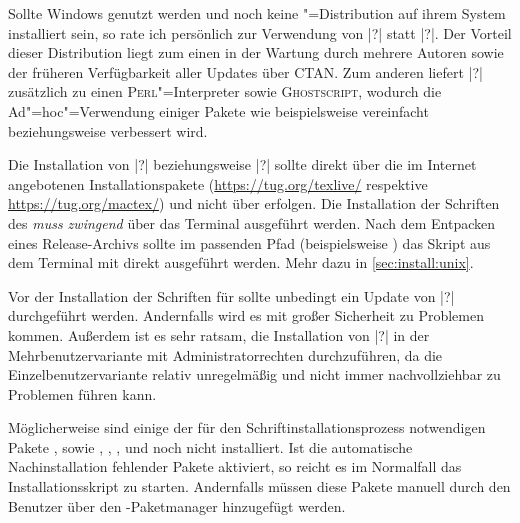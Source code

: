 

Sollte Windows genutzt werden und noch keine "=Distribution auf 
ihrem System installiert sein, so rate ich persönlich zur Verwendung von 
|?| statt |?|. 
Der Vorteil dieser Distribution liegt zum einen in der Wartung durch mehrere 
Autoren sowie der früheren Verfügbarkeit aller Updates über CTAN. Zum anderen 
liefert |?| zusätzlich zu  einen 
\textsc{Perl}"=Interpreter sowie \textsc{Ghostscript}, wodurch die 
Ad"=hoc"=Verwendung einiger Pakete wie beispielsweise  
vereinfacht beziehungsweise verbessert wird. 


Die Installation von |?| beziehungsweise 
|?| sollte direkt über die im Internet 
angebotenen Installationspakete (\url{https://tug.org/texlive/} respektive 
\url{https://tug.org/mactex/}) und nicht über  erfolgen. 
%
Die Installation der Schriften des \CDs \emph{muss zwingend} über das Terminal 
ausgeführt werden. Nach dem Entpacken eines Release-Archivs sollte im passenden 
Pfad (beispielsweise ) 
das Skript aus dem Terminal mit  direkt ausgeführt 
werden. Mehr dazu in \autoref{sec:install:unix}.


Vor der Installation der Schriften für \TUDScript sollte unbedingt ein Update 
von |?| durchgeführt werden. Andernfalls wird 
es mit großer Sicherheit zu Problemen kommen. Außerdem ist es sehr ratsam, die 
Installation von |?| in der Mehrbenutzervariante 
mit Administratorrechten durchzuführen, da die Einzelbenutzervariante relativ
unregelmäßig und nicht immer nachvollziehbar zu Problemen führen kann. 

Möglicherweise sind einige der für den Schriftinstallationsprozess notwendigen 
Pakete ,  sowie , 
, ,  und  
noch nicht installiert. Ist die automatische Nachinstallation fehlender Pakete 
aktiviert, so reicht es im Normalfall das Installationsskript zu starten. 
Andernfalls müssen diese Pakete manuell durch den Benutzer über den 
-Paketmanager hinzugefügt werden.

